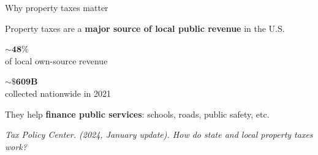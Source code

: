 \documentclass[aspectratio=169,12pt,]{beamer}
\newcommand{\1}{\mathbf{1}}
\begin{document}
\begin{frame}{Why property taxes matter}

\centering

Property taxes are a \textbf{major source of local public revenue} in the U.S.

\vspace{3mm}

\begin{tcolorbox}[
    width=0.58\textwidth,
    colback=MethodBlue!10,
    colframe=MethodBlue!60,
    boxsep=2pt,
    left=4pt,right=4pt,top=5pt,bottom=5pt,
    arc=1mm,
    boxrule=1.5pt
]
\centering
{\Large \textbf{\(\mathbf{\sim 48\%}\)}}\\[1mm]
{\footnotesize of local own-source revenue}
\end{tcolorbox}

\vspace{2mm}

\begin{tcolorbox}[
    width=0.58\textwidth,
    colback=Good!10,
    colframe=Good!60,
    boxsep=2pt,
    left=4pt,right=4pt,top=5pt,bottom=5pt,
    arc=1mm,
    boxrule=1.5pt
]
\centering
{\Large \(\mathbf{\sim \$609}\textbf{B}\)}\\[1mm]
{\footnotesize collected nationwide in 2021}
\end{tcolorbox}

\vspace{3mm}

        


They help \textbf{finance public services}: {schools, roads, public safety, etc.}


\begin{center}
    \color{gray}
    \vspace{3mm}
    \scriptsize \itshape Tax Policy Center. (2024, January update). How do state and local property taxes work?
\end{center}

\end{frame}
\end{document}
